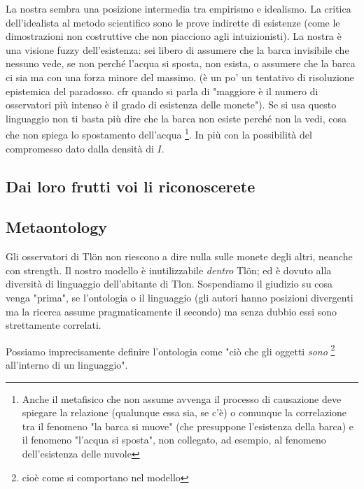 
La nostra sembra una posizione intermedia tra empirismo e idealismo. La critica dell'idealista al metodo scientifico sono le prove indirette di esistenze (come le dimostrazioni non costruttive che non piacciono agli intuizionisti). La nostra è una visione fuzzy dell'esistenza: sei libero di assumere che la barca invisibile che nessuno vede, se non perché l'acqua si sposta, non esista, o assumere che la barca ci sia ma con una forza minore del massimo. (è un po' un tentativo di risoluzione epistemica del paradosso. cfr quando si parla di "maggiore è il numero di osservatori più intenso è il grado di esistenza delle monete"). Se si usa questo linguaggio non ti basta più dire che la barca non esiste perché non la vedi, cosa che non spiega lo spostamento dell'acqua \footnote{Anche il metafisico che non assume avvenga il processo di causazione deve spiegare la relazione (qualunque essa sia, se c'è) o comunque la correlazione tra il fenomeno "la barca si muove" (che presuppone l'esistenza della barca) e il fenomeno "l'acqua si sposta", non collegato, ad esempio, al fenomeno dell'esistenza delle nuvole}. In più con la possibilità del compromesso dato dalla densità di $I$.
\subsection{Dai loro frutti voi li riconoscerete}\label{frutti}


\subsection{Metaontology} \label{metaon} 
Gli osservatori di Tl\"on non riescono a dire nulla sulle monete degli altri, neanche con strength. Il nostro modello è inutilizzabile \emph{dentro} Tl\"on; ed è dovuto alla diversità di linguaggio dell'abitante di Tlon. Sospendiamo il giudizio su cosa venga "prima", se l'ontologia o il linguaggio (gli autori hanno posizioni divergenti ma la ricerca assume pragmaticamente il secondo) ma senza dubbio essi sono strettamente correlati.

Possiamo imprecisamente definire l'ontologia come "ciò che gli oggetti \emph{sono} \footnote{cioè come si comportano nel modello} all'interno di un linguaggio".

